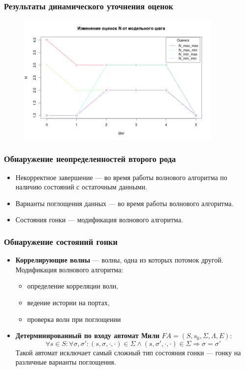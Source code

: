 \documentclass[10pt,pdf,hyperref={unicode}]{beamer}
\newcommand{\FA}{F\!A}
\begin{document}
\begin{frame}
  \frametitle{Результаты динамического уточнения оценок}
  \begin{figure}[H]
    \centering
    \includegraphics[width=0.9\textwidth]{Rplot01}
  \end{figure}
\end{frame}

\begin{frame}
  \frametitle{Обнаружение неопределенностей второго рода}
  \begin{itemize}
    \item Некорректное завершение --- во время работы волнового алгоритма по наличию состояний с остаточным данными.
    \item Варианты поглощения данных --- во время работы волнового алгоритма.
    \item Состояния гонки --- модификация волнового алгоритма.
  \end{itemize}
\end{frame}

\begin{frame}
  \frametitle{Обнаружение состояний гонки}
  \begin{itemize}
    \item \textbf{Коррелирующие волны} --- волны, одна из которых потомок другой.\\
    Модификация волнового алгоритма:
    \begin{itemize}
      \item определение корреляции волн,
      \item ведение истории на портах,
      \item проверка волн при поглощении
    \end{itemize}
 \item \textbf{Детерминированный по входу автомат Мили} $\FA = (S, s_0, \Sigma, \Lambda, E)$:
    $$\forall s \in S: \forall \sigma, \sigma': (s, \sigma, \cdot, \cdot) \in \Sigma \wedge (s, \sigma', \cdot, \cdot) \in \Sigma \Rightarrow \sigma = \sigma'$$
    Такой автомат исключает самый сложный тип состояния гонки --- гонку на различные варианты поглощения.
  \end{itemize}
\end{frame}
\end{document}
